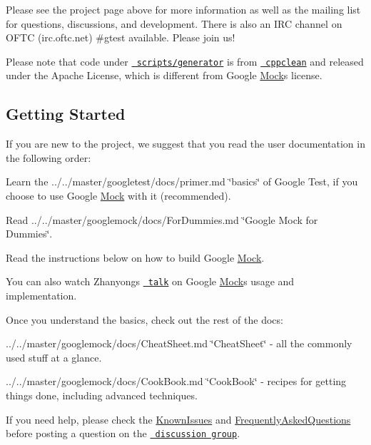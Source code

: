 Please see the project page above for more information as well as the mailing list for questions, discussions, and development. There is also an I\+RC channel on O\+F\+TC (irc.\+oftc.\+net) \#gtest available. Please join us!

Please note that code under \href{scripts/generator/}{\texttt{ scripts/generator}} is from \href{http://code.google.com/p/cppclean/}{\texttt{ cppclean}} and released under the Apache License, which is different from Google \mbox{\hyperlink{class_mock}{Mock}}\textquotesingle{}s license.

\subsection*{Getting Started}

If you are new to the project, we suggest that you read the user documentation in the following order\+:


\begin{DoxyItemize}
\item Learn the ../../master/googletest/docs/primer.md \char`\"{}basics\char`\"{} of Google Test, if you choose to use Google \mbox{\hyperlink{class_mock}{Mock}} with it (recommended).
\item Read ../../master/googlemock/docs/\+For\+Dummies.md \char`\"{}\+Google Mock for Dummies\char`\"{}.
\item Read the instructions below on how to build Google \mbox{\hyperlink{class_mock}{Mock}}.
\end{DoxyItemize}

You can also watch Zhanyong\textquotesingle{}s \href{http://www.youtube.com/watch?v=sYpCyLI47rM}{\texttt{ talk}} on Google \mbox{\hyperlink{class_mock}{Mock}}\textquotesingle{}s usage and implementation.

Once you understand the basics, check out the rest of the docs\+:


\begin{DoxyItemize}
\item ../../master/googlemock/docs/\+Cheat\+Sheet.md \char`\"{}\+Cheat\+Sheet\char`\"{} -\/ all the commonly used stuff at a glance.
\item ../../master/googlemock/docs/\+Cook\+Book.md \char`\"{}\+Cook\+Book\char`\"{} -\/ recipes for getting things done, including advanced techniques.
\end{DoxyItemize}

If you need help, please check the \mbox{\hyperlink{_obj__test_2lib_2googletest-release-1_88_81_2googlemock_2docs_2_known_issues_8md}{Known\+Issues}} and \mbox{\hyperlink{_obj__test_2lib_2googletest-release-1_88_81_2googlemock_2docs_2_frequently_asked_questions_8md}{Frequently\+Asked\+Questions}} before posting a question on the \href{http://groups.google.com/group/googlemock}{\texttt{ discussion group}}.

